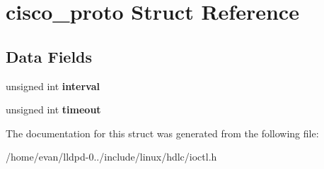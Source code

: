 \section{cisco\-\_\-proto \-Struct \-Reference}
\label{structcisco__proto}
\subsection*{\-Data \-Fields}
\begin{DoxyCompactItemize}
\item 
unsigned int {\bfseries interval}\label{structcisco__proto_a23545cd41cdc93998f5b3caeb3e29936}

\item 
unsigned int {\bfseries timeout}\label{structcisco__proto_a25af7eefd48048fb067a60b8e295caf1}

\end{DoxyCompactItemize}


\-The documentation for this struct was generated from the following file\-:\begin{DoxyCompactItemize}
\item 
/home/evan/lldpd-\/0../include/linux/hdlc/ioctl.\-h\end{DoxyCompactItemize}
